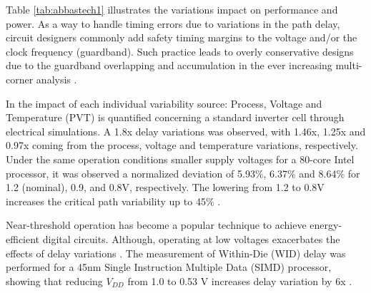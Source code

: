 \documentclass[pgmicro,mestrado,english]{iiufrgs}
\begin{document}
\begin{table}[]
\centering
\caption{Impact of variability on performance and power.}
\label{tab:abbastech1}
\end{table}

Table \ref{tab:abbastech1} illustrates the variations impact on performance and power. As a way to handle timing errors due to variations in the path delay, circuit designers commonly add safety timing margins to the voltage and/or the clock frequency (guardband). Such practice leads to overly conservative designs due to the guardband overlapping and accumulation in the ever increasing multi-corner analysis \cite{austin2005opportunities}.

In \cite{jeong2009impact} the impact of each individual variability source: Process, Voltage and Temperature (PVT) is quantified concerning a standard inverter cell through electrical simulations. A 1.8x delay variations was observed, with 1.46x, 1.25x and 0.97x coming from the process, voltage and temperature variations, respectively. Under the same operation conditions smaller supply voltages for a 80-core Intel processor, it was observed a normalized deviation of 5.93\%, 6.37\% and 8.64\% for 1.2 (nominal), 0.9, and 0.8V, respectively. The lowering from 1.2 to 0.8V increases the critical path variability up to 45\% \cite{dighe2011within}.

Near-threshold operation has become a popular technique to achieve energy-efficient digital circuits. Although, operating at low voltages exacerbates the effects of delay variations \cite{jeon2012design, dreslinski2010near, rithe2011effect, kakoee2012variation, pawlowski2012530mv}.
The measurement of Within-Die (WID) delay was performed for a 45nm Single Instruction Multiple Data (SIMD) processor, showing that reducing $V_{DD}$ from 1.0 to 0.53 V increases delay variation by 6x \cite{pawlowski2012530mv}.
\end{document}
